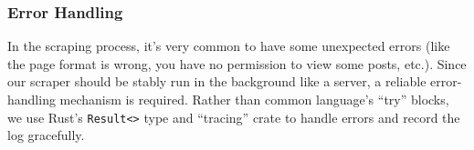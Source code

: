 \documentclass{article}
\begin{document}
	\subsubsection{Error Handling}

	In the scraping process, it's very common to have some unexpected errors (like the page format is wrong, you have no permission to view some posts, etc.). Since our scraper should be stably run in the background like a server, a reliable error-handling mechanism is required. Rather than common language's ``try'' blocks, we use Rust's \texttt{Result<>} type and ``tracing'' crate to handle errors and record the log gracefully.

	\normalem
	
	
\end{document}
